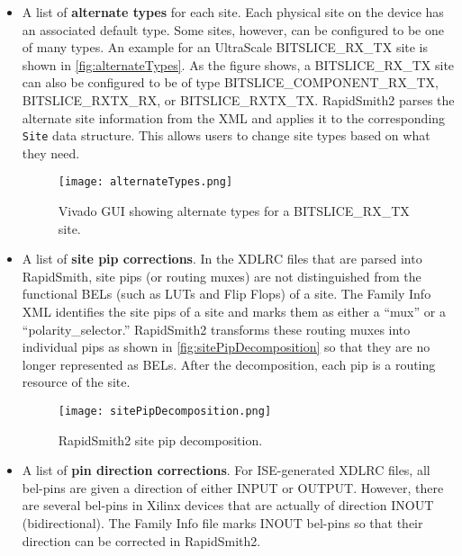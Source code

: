 \begin{itemize}
  \item A list of \textbf{alternate types} for each site. Each physical site on
  the device has an associated default type. Some sites, however, can be
  configured to be one of many types. An example for an UltraScale
  BITSLICE\_RX\_TX site is shown in \autoref{fig:alternateTypes}. As the figure
  shows, a BITSLICE\_RX\_TX site can also be configured to be of type
  BITSLICE\_COMPONENT\_RX\_TX, BITSLICE\_RXTX\_RX, or BITSLICE\_RXTX\_TX.
  RapidSmith2 parses the alternate site information from the XML and applies it
  to the corresponding \texttt{Site} data structure. This allows users to change
  site types based on what they need.
  
  \begin{figure}[H]
    \centering
    \texttt{[image: alternateTypes.png]}
    \caption{Vivado GUI showing alternate types for a BITSLICE\_RX\_TX site.}
    \label{fig:alternateTypes}
  \end{figure}
  
  \item A list of \textbf{site pip corrections}. In the XDLRC files that are
  parsed into RapidSmith, site pips (or routing muxes) are not distinguished
  from the functional BELs (such as LUTs and Flip Flops) of a site. The
  Family Info XML identifies the site pips of a site and marks them as either
  a ``mux'' or a ``polarity\_selector.'' RapidSmith2 transforms these routing
  muxes into individual pips as shown in \autoref{fig:sitePipDecomposition} so
  that they are no longer represented as BELs. After the decomposition, each pip
  is a routing resource of the site.
  
  \begin{figure}[H]
    \centering
    \texttt{[image: sitePipDecomposition.png]}
    \caption{RapidSmith2 site pip decomposition.}
    \label{fig:sitePipDecomposition}
  \end{figure}
  
  \item A list of \textbf{pin direction corrections}. For ISE-generated XDLRC
  files, all bel-pins are given a direction of either INPUT or OUTPUT. However,
  there are several bel-pins in Xilinx devices that are actually of direction
  INOUT (bidirectional). The Family Info file marks INOUT bel-pins so that
  their direction can be corrected in RapidSmith2.
  
\end{itemize}

